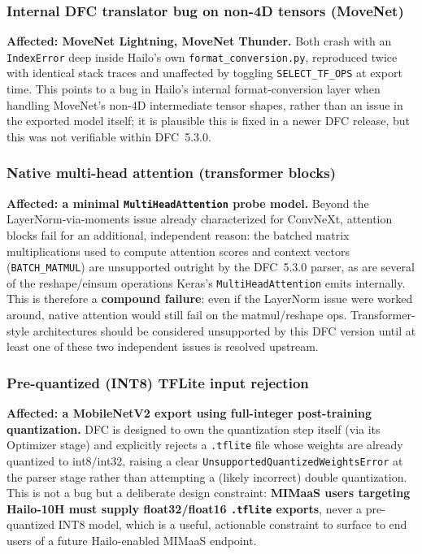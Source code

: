 \documentclass[11pt]{article}
\begin{document}
\subsubsection{Internal DFC translator bug on non-4D tensors (MoveNet)}
\textbf{Affected: MoveNet Lightning, MoveNet Thunder.} Both crash with an
\texttt{IndexError} deep inside Hailo's own \texttt{format\_conversion.py},
reproduced twice with identical stack traces and unaffected by toggling
\texttt{SELECT\_TF\_OPS} at export time. This points to a bug in Hailo's
internal format-conversion layer when handling MoveNet's non-4D intermediate
tensor shapes, rather than an issue in the exported model itself; it is
plausible this is fixed in a newer DFC release, but this was not verifiable
within DFC~5.3.0.

\subsubsection{Native multi-head attention (transformer blocks)}
\textbf{Affected: a minimal \texttt{MultiHeadAttention} probe model.} Beyond
the LayerNorm-via-moments issue already characterized for ConvNeXt, attention
blocks fail for an additional, independent reason: the batched matrix
multiplications used to compute attention scores and context vectors
(\texttt{BATCH\_MATMUL}) are unsupported outright by the DFC~5.3.0 parser, as
are several of the reshape/einsum operations Keras's \texttt{MultiHeadAttention}
emits internally. This is therefore a \textbf{compound failure}: even if the
LayerNorm issue were worked around, native attention would still fail on the
matmul/reshape ops. Transformer-style architectures should be considered
unsupported by this DFC version until at least one of these two independent
issues is resolved upstream.

\subsubsection{Pre-quantized (INT8) TFLite input rejection}
\textbf{Affected: a MobileNetV2 export using full-integer post-training
quantization.} DFC is designed to own the quantization step itself (via its
Optimizer stage) and explicitly rejects a \texttt{.tflite} file whose weights
are already quantized to int8/int32, raising a clear
\texttt{UnsupportedQuantizedWeightsError} at the parser stage rather than
attempting a (likely incorrect) double quantization. This is not a bug but a
deliberate design constraint: \textbf{MIMaaS users targeting Hailo-10H must
supply float32/float16 \texttt{.tflite} exports}, never a pre-quantized
INT8 model, which is a useful, actionable constraint to surface to end users
of a future Hailo-enabled MIMaaS endpoint.
\end{document}
